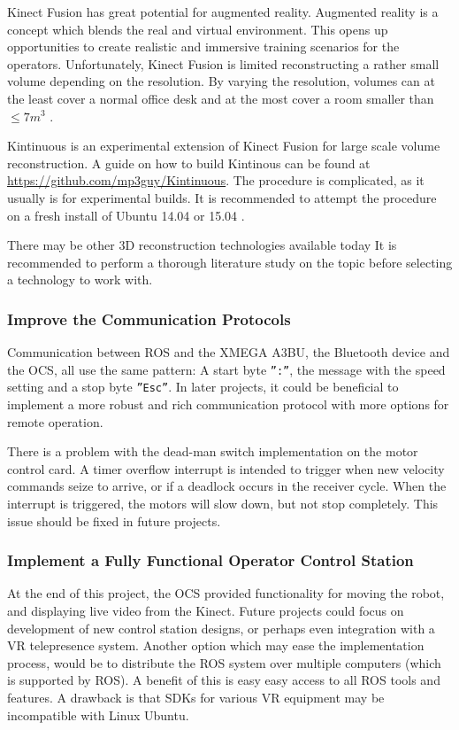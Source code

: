 Kinect Fusion has great potential for augmented reality. Augmented reality is a concept which blends the real and virtual environment. This opens up opportunities to create realistic and immersive training scenarios for the operators. Unfortunately, Kinect Fusion is limited reconstructing a rather small volume depending on the resolution. By varying the resolution, volumes can at the least cover a normal office desk and at the most cover a room smaller than $\leq 7 m^3$ \cite{newcombe2011kinectfusion}.  

Kintinuous is an experimental extension of Kinect Fusion for large scale volume reconstruction. A guide on how to build Kintinous can be found  at \href{Github}{https://github.com/mp3guy/Kintinuous}. The procedure is complicated, as it usually is for experimental builds. It is recommended to attempt the procedure on a fresh install of Ubuntu 14.04 or 15.04 \cite{Kintinous}.

There may be other 3D reconstruction technologies available today It is recommended to perform a thorough literature study on the topic before selecting a technology to work with.

\subsubsection{Improve the Communication Protocols}

Communication between \ac{ROS} and the XMEGA A3BU, the Bluetooth device and the \ac{OCS}, all use the same pattern: A start byte \texttt{'':''}, the message with the speed setting and a stop byte \texttt{''Esc''}. In later projects, it could be beneficial to implement a more robust and rich communication protocol with more options for remote operation. 

There is a problem with the dead-man switch implementation on the motor control card. A timer overflow interrupt is intended to trigger when new velocity commands seize to arrive, or if a deadlock occurs in the receiver cycle. When the interrupt is triggered, the motors will slow down, but not stop completely. This issue should be fixed in future projects.

\subsubsection{Implement a Fully Functional Operator Control Station}

At the end of this project, the \ac{OCS} provided functionality for moving the robot, and displaying live video from the Kinect. Future projects could focus on development of new control station designs, or perhaps even integration with a \ac{VR} telepresence system. Another option which may ease the implementation process, would be to distribute the \ac{ROS} system over multiple computers (which is supported by \ac{ROS}). A benefit of this is easy easy access to all \ac{ROS} tools and features. A drawback is that SDKs for various \ac{VR} equipment may be incompatible with Linux Ubuntu. 

